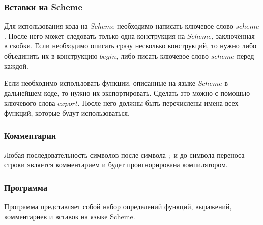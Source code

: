             

        \subsubsection{Вставки на Scheme}
            Для использования кода на $Scheme$ необходимо написать ключевое слово $scheme$.
            После него может следовать только одна конструкция на $Scheme$, заключённая в скобки.
            Если необходимо описать сразу несколько конструкций, то нужно либо объединить их в конструкцию $begin$, либо писать ключевое слово $scheme$ перед каждой.
            
            

            Если необходимо использовать функции, описанные на языке $Scheme$ в дальнейшем коде, то нужно их экспортировать.
            Сделать это можно с помощью ключевого слова $export$.
            После него должны быть перечислены имена всех функций, которые будут использоваться.
            
            

        \subsubsection{Комментарии}
            Любая последовательность символов после символа $;$ и до символа переноса строки является комментарием и будет проигнорирована компилятором.

            

        \subsubsection{Программа}
            Программа представляет собой набор определений функций, выражений, комментариев и вставок на языке Scheme.

            
